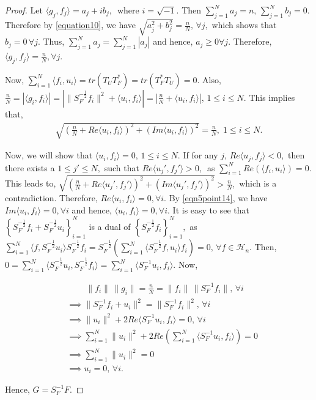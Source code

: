 \documentclass[final,1p,times]{elsarticle}
\begin{document}
\begin{proof}
Let $\langle g_j,f_j\rangle = a_j +ib_j,\,$ where $i = \sqrt{-1}.$ Then $\sum\limits_{j=1}^N a_j =n,\,\sum\limits_{j=1}^N b_j=0.$ Therefore by \eqref{equation10}, we have $\sqrt{a^2_{j}+ b^2_{j} } = \frac{n}{N}, \,\forall j, $ which shows that $b_j =0\,\forall j.$ Thus, $\sum\limits_{j=1}^N a_j = \sum\limits_{j=1}^N \left|a_j \right| $ and hence, $a_j \geq 0 \forall j.$ Therefore, $\langle g_j,f_j\rangle= \frac{n}{N}, \forall j.$ 

Now, $\sum\limits_{i=1}^N \langle f_i,u_i \rangle = tr(T_U T_{F}^*)= tr(T_{F}^* T_U) = 0.$  Also, $\frac{n}{N} = |\langle g_i,f_i\rangle| = \left| \|  S_{F}^{-\frac{1}{2}}f_i \|^2 + \langle u_i,f_i\rangle    \right| = \left| \frac{n}{N} + \langle u_i,f_i\rangle   \right| ,\, 1 \leq i \leq N.$ This implies that,
 	\begin{align}\label{eqn5point14}
 		\sqrt{\left( \frac{n}{N} + Re \langle u_i,f_i\rangle  \right)^2 + \left( Im \langle u_i,f_i\rangle \right)^2} = \frac{n}{N}, \;1 \leq i \leq N.
 	\end{align}

 Now, we will show that $\langle u_i,f_i\rangle =0,\,1 \leq i \leq N.$ If for any $j,\, Re \langle u_j,f_j\rangle < 0,$ then there exists a $1\leq j'\leq N,$ such that  $ Re \langle u_j',f_j'\rangle > 0,\,$ as $\sum\limits_{i=1}^N Re\left(\langle f_i,u_i \rangle \right) =0.$  This leads to, $\sqrt{\left( \frac{n}{N} + Re \langle u_j',f_j'\rangle  \right)^2 + \left( Im \langle u_j',f_j'\rangle \right)^2} > \frac{n}{N},$ which is a contradiction. Therefore, $ Re \langle u_i,f_i\rangle  = 0, \forall i.$ By \eqref{eqn5point14}, we have $ Im \langle u_i,f_i\rangle  = 0, \forall i$ and hence, $\langle u_i,f_i\rangle  = 0, \forall i.$
It is easy to see that $\left\{ S_{F}^{-\frac{1}{2}}f_i + S_{F}^{-\frac{1}{2}}u_i\right\}_{i=1}^N$ is a dual of $\left\{ S_{F}^{-\frac{1}{2}}f_i \right\}_{i=1}^N,$ as $\sum\limits_{i=1}^N \langle f, S_{F}^{-\frac{1}{2}}u_i \rangle S_{F}^{-\frac{1}{2}}f_i = S_{F}^{-\frac{1}{2}}\left(\sum\limits_{i=1}^N\langle S_{F}^{-\frac{1}{2}}f,u_i\rangle f_i  \right) = 0,\,\forall f \in \mathcal{H}_n. $ Then, $0=\sum\limits_{i=1}^N \langle S_{F}^{-\frac{1}{2}}u_i, S_{F}^{-\frac{1}{2}}f_i \rangle= \sum\limits_{i=1}^N \langle S_{F}^{-1}u_i, f_i \rangle. $ Now,
 	
 \begin{align*}
 &\;\;\;\;\;\;\;\;	\|f_i\|\,\|g_i\|  = \frac{n}{N} = 	\|f_i\|\,\|S_{F}^{-1}f_i\|, \,\forall i\\&
 	\implies \| S_{F}^{-1}f_i + u_i \|^2 = \|S_{F}^{-1}f_i\|^2,\,\forall i \\&
 	\implies \|u_i\|^2 + 2 Re \langle S_{F}^{-1}u_i, f_i \rangle =0,\,\forall i \\&
 	\implies \sum\limits_{i=1}^N \|u_i\|^2 + 2 Re \left(\sum\limits_{i=1}^N \langle S_{F}^{-1}u_i, f_i \rangle \right) =0 \\&
 	\implies  \sum\limits_{i=1}^N \|u_i\|^2 =0 \\&
 	\implies u_i =0,\, \forall i.
 \end{align*}
 	
 	Hence,  $G = S_{F}^{-1}F. $
    
\end{proof}
 
\end{document}
